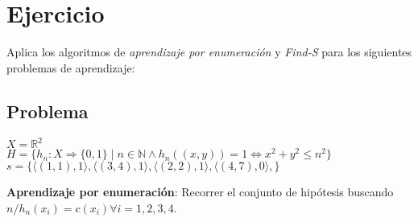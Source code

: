 \documentclass{article}
\begin{document}
\section{Ejercicio}
Aplica los algoritmos de \textit{aprendizaje por enumeración} y \textit{Find-S} para los siguientes problemas de aprendizaje:
\subsection{Problema}
\begin{flushleft}
\(X = \mathbb R^2\)\\
\(H = \{h_n : X \Rightarrow \{0, 1\} \mid n \in \mathbb N \land h_n((x, y)) = 1 \Leftrightarrow x^2 + y^2 \leq n^2\}\)\\
\(s = \{ \langle (1, 1), 1\rangle , \langle (3, 4), 1\rangle , \langle (2, 2), 1\rangle , \langle(4, 7), 0\rangle ,\}\)
\end{flushleft}

\textbf{Aprendizaje por enumeración}: Recorrer el conjunto de hipótesis buscando \(n / h_n (x_i) = c(x_i) \forall i = 1, 2, 3, 4\).
\end{document}
